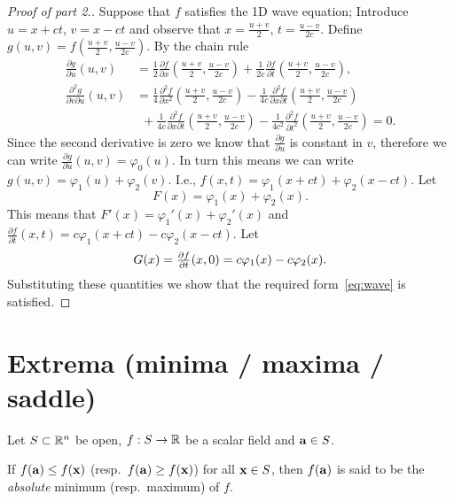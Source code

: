 \begin{proof}[Proof of part 2.]
    Suppose that \(f\) satisfies the 1D wave equation;
    Introduce \(u = x + ct\), \(v=x-ct\)
    and observe that \(x = \frac{u+v}{2}\), \(t=\frac{u-v}{2c}\).
    Define \(g(u,v) = f(   \frac{u+v}{2} , \frac{u-v}{2c} )\).
    By the chain rule
    \[
        \begin{aligned}
            \tfrac{\partial g}{\partial u}(u,v)
             & = \tfrac{1}{2} \tfrac{\partial f}{\partial x}(   \tfrac{u+v}{2} , \tfrac{u-v}{2c} )
            + \tfrac{1}{2c} \tfrac{\partial f}{\partial t}(   \tfrac{u+v}{2} , \tfrac{u-v}{2c} ),                     \\
            \tfrac{\partial^2 g}{\partial v \partial u}(u,v)
             & = \tfrac{1}{4} \tfrac{\partial^2 f}{\partial x^2}(   \tfrac{u+v}{2} , \tfrac{u-v}{2c} )
            - \tfrac{1}{4c} \tfrac{\partial^2 f}{\partial x\partial t}(   \tfrac{u+v}{2} , \tfrac{u-v}{2c} )          \\
             & \ \ +  \tfrac{1}{4c} \tfrac{\partial^2 f}{\partial x \partial t}(   \tfrac{u+v}{2} , \tfrac{u-v}{2c} )
            -  \tfrac{1}{4c^2} \tfrac{\partial^2 f}{\partial t^2}(   \tfrac{u+v}{2} , \tfrac{u-v}{2c} ) = 0.
        \end{aligned}
    \]
    Since the second derivative is zero we know that \(\tfrac{\partial g}{\partial u}\) is constant in \(v\), therefore we can write \( \tfrac{\partial g}{\partial u}(u,v) = \varphi_0(u)\).
    In turn this means we can write \(g(u,v) = \varphi_1(u) + \varphi_2(v)\).
    I.e., \(f(x,t) = \varphi_1(x+ct) + \varphi_2(x-ct)\).
    Let
    \[
        F(x) = \varphi_1(x) + \varphi_2(x).
    \]
    This means that
    \(F'(x) = \varphi_1'(x) + \varphi_2'(x)\)
    and \(\frac{\partial f}{\partial t}(x,t) = c\varphi_1(x+ct) - c\varphi_2(x-ct)\).
    Let
    \[
        G(x) = \tfrac{\partial f}{\partial t}(x,0) = c\varphi_1(x) - c\varphi_2(x). \qedhere
    \]
    Substituting these quantities we show that the required form~\eqref{eq:wave} is satisfied.
\end{proof}

\section{Extrema (minima / maxima / saddle)}

Let \(S\subset \bR^n\) be open,
\(f:S \to \bR\) be a scalar field
and \(\aa \in S\).

\begin{definition}
    If \(f(\aa)\leq f(\xx)\) (resp.\ \(f(\aa)\geq f(\xx)\)) for all \(\xx \in S\), then \(f(\aa)\) is said to be the \emph{absolute} minimum (resp.\ maximum) of \(f\).
\end{definition}

